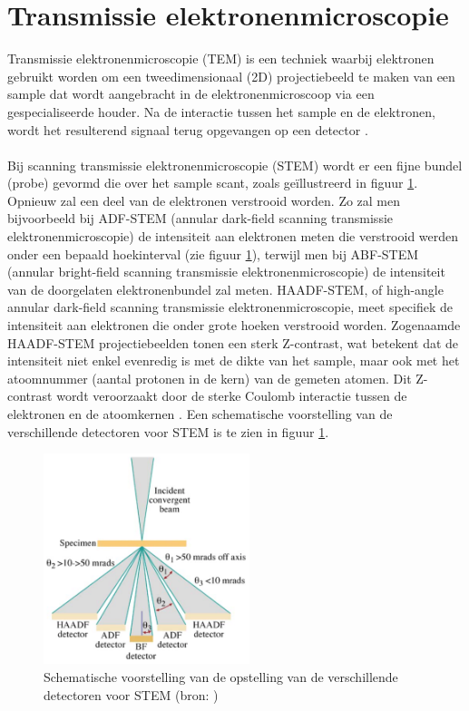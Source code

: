 \documentclass{report}
\begin{document}
\section{Transmissie elektronenmicroscopie} \label{ch:tem}
Transmissie elektronenmicroscopie (TEM) is een techniek waarbij elektronen gebruikt worden om een tweedimensionaal (2D) projectiebeeld te maken van een sample dat wordt aangebracht in de elektronenmicroscoop via een gespecialiseerde houder. Na de interactie tussen het sample en de elektronen, wordt het resulterend signaal terug opgevangen op een detector \cite{book:williamscarter}.
\\ \\
Bij scanning transmissie elektronenmicroscopie (STEM) wordt er een fijne bundel (probe) gevormd die over het sample scant, zoals geïllustreerd in figuur \ref{fig:tem_detectors}. Opnieuw zal een deel van de elektronen verstrooid worden. Zo zal men bijvoorbeeld bij ADF-STEM (annular dark-field scanning transmissie elektronenmicroscopie) de intensiteit aan elektronen meten die verstrooid werden onder een bepaald hoekinterval (zie figuur \ref{fig:tem_detectors}), terwijl men bij ABF-STEM (annular bright-field scanning transmissie elektronenmicroscopie) de intensiteit van de doorgelaten elektronenbundel zal meten. HAADF-STEM, of high-angle annular dark-field scanning transmissie elektronenmicroscopie, meet specifiek de intensiteit aan elektronen die onder grote hoeken verstrooid worden. Zogenaamde HAADF-STEM projectiebeelden tonen een sterk Z-contrast, wat betekent dat de intensiteit niet enkel evenredig is met de dikte van het sample, maar ook met het atoomnummer (aantal protonen in de kern) van de gemeten atomen. Dit Z-contrast wordt veroorzaakt door de sterke Coulomb interactie tussen de elektronen en de atoomkernen \cite{book:williamscarter}. Een schematische voorstelling van de verschillende detectoren voor STEM is te zien in figuur \ref{fig:tem_detectors}.
\begin{figure}[h!]
	\centering
	\includegraphics[width=6cm]{images/tem/detectors.png}
	\caption{Schematische voorstelling van de opstelling van de verschillende detectoren voor STEM (bron: \cite{book:williamscarter})}
	\label{fig:tem_detectors}
\end{figure}
\end{document}
